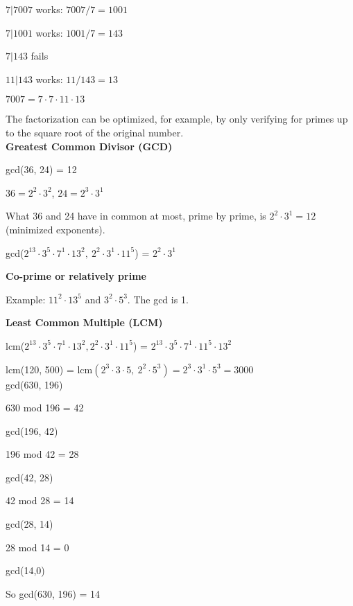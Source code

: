 \documentclass{exam}
\begin{document}
    $7|7007$ works: $7007/7 = 1001$
    
    $7|1001$ works: $1001/7 = 143$
    
    $7|143$ fails
    
    $11|143$ works: $11/143 = 13$
    
    $7007 = 7 \cdot 7 \cdot 11 \cdot 13$
    
    The factorization can be optimized, for example, by only verifying for primes up to the square root of the original number.\\
    
    \textbf{Greatest Common Divisor (GCD)}
    
    gcd(36, 24) = 12
    
    $36 = 2^2 \cdot 3^2$, $24 = 2^3 \cdot 3^1$
    
    What 36 and 24 have in common at most, prime by prime, is $2^2 \cdot 3^1 = 12$ (minimized exponents).
    
    gcd($2^{13} \cdot 3^5 \cdot 7^1 \cdot 13^2,\ 2^2 \cdot 3^1 \cdot 11^5$) = $2^2 \cdot 3^1$
    
     \textbf{Co-prime or relatively prime}
     
     Example: $11^2 \cdot 13^5$ and $3^2 \cdot 5^3$. The gcd is 1.
     
     \textbf{Least Common Multiple (LCM)}
     
     lcm($2^{13} \cdot 3^5 \cdot 7^1 \cdot 13^2, 2^2 \cdot 3^1 \cdot 11^5$) = $2^{13} \cdot 3^5 \cdot 7^1 \cdot 11^5 \cdot 13^2$
     
     lcm(120, 500) = lcm$(2^3 \cdot 3 \cdot 5,\ 2^2 \cdot 5^3) = 2^3 \cdot 3^1 \cdot 5^3 = 3000$\\
     
    gcd(630, 196)
    
    630 mod 196 = 42
    
    gcd(196, 42)
    
    196 mod 42 = 28
    
    gcd(42, 28)
    
    42 mod 28 = 14
    
    gcd(28, 14)
    
    28 mod 14 = 0
    
    gcd(14,0)
    
    So gcd(630, 196) = 14
    
\end{document}
